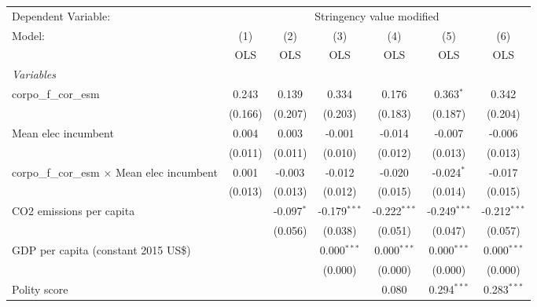 
\begingroup
\centering
\begin{tabular}{lcccccc}
   \toprule
   Dependent Variable: & \multicolumn{6}{c}{Stringency value modified}\\
   Model:                                              & (1)     & (2)          & (3)            & (4)            & (5)            & (6)\\  
                                                       &  OLS    & OLS          & OLS            & OLS            & OLS            & OLS\\  
   \midrule
   \emph{Variables}\\
   corpo\_f\_cor\_esm                                  & 0.243   & 0.139        & 0.334          & 0.176          & 0.363$^{*}$    & 0.342\\   
                                                       & (0.166) & (0.207)      & (0.203)        & (0.183)        & (0.187)        & (0.204)\\   
   Mean elec incumbent                                 & 0.004   & 0.003        & -0.001         & -0.014         & -0.007         & -0.006\\   
                                                       & (0.011) & (0.011)      & (0.010)        & (0.012)        & (0.013)        & (0.013)\\   
   corpo\_f\_cor\_esm $\times$ Mean elec incumbent     & 0.001   & -0.003       & -0.012         & -0.020         & -0.024$^{*}$   & -0.017\\   
                                                       & (0.013) & (0.013)      & (0.012)        & (0.015)        & (0.014)        & (0.015)\\   
   CO2 emissions per capita                            &         & -0.097$^{*}$ & -0.179$^{***}$ & -0.222$^{***}$ & -0.249$^{***}$ & -0.212$^{***}$\\   
                                                       &         & (0.056)      & (0.038)        & (0.051)        & (0.047)        & (0.057)\\   
   GDP per capita (constant 2015 US\$)                 &         &              & 0.000$^{***}$  & 0.000$^{***}$  & 0.000$^{***}$  & 0.000$^{***}$\\   
                                                       &         &              & (0.000)        & (0.000)        & (0.000)        & (0.000)\\   
   Polity score                                        &         &              &                & 0.080          & 0.294$^{***}$  & 0.283$^{***}$\\   

\end{tabular}
